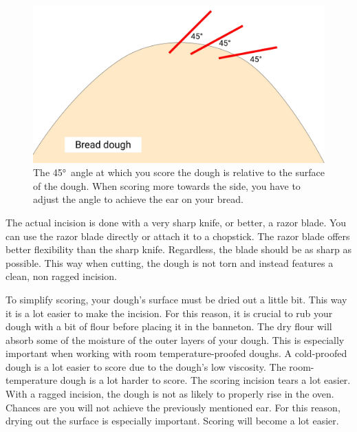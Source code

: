 \begin{figure}[htb!]
  \centering
  \includegraphics[width=\textwidth]{bread-scoring-angle}
  \caption[Scoring angle]{The \ang{45}~angle at which you score the
      dough is relative to the surface of the dough.  When scoring more towards
      the side, you have to adjust the angle to achieve the ear on your
      bread.}%
  \label{fig:scoring-angle}
\end{figure}

The actual incision is done with a very sharp knife, or better, a razor
blade. You can use the razor blade directly or attach it to a chopstick.
The razor blade offers better flexibility than the sharp knife.
Regardless, the blade should be as sharp as possible. This way when cutting,
the dough is not torn and instead features a clean, non ragged incision.

To simplify scoring, your dough's surface must be dried out a little bit.
This way it is a lot easier to make the incision.
For this reason, it is crucial to rub your dough with a bit of flour
before placing it in the banneton. The dry flour will absorb some of the
moisture of the outer layers of your dough. This is especially important
when working with room temperature-proofed doughs. A cold-proofed dough
is a lot easier to score due to the dough's low viscosity. The room-temperature
dough is a lot harder to score. The scoring incision tears a lot
easier. With a ragged incision, the dough is not as likely to properly
rise in the oven. Chances are you will not achieve the previously mentioned
ear. For this reason, drying out the surface is especially important. Scoring
will become a lot easier.

